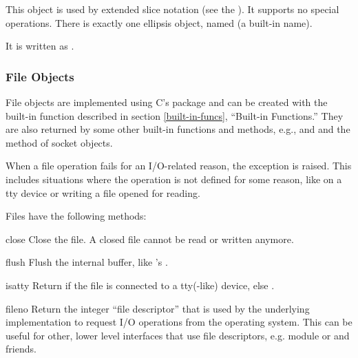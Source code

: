 This object is used by extended slice notation (see the
).  It supports no
special operations.  There is exactly one ellipsis object, named
 (a built-in name).

It is written as .

\subsubsection{File Objects
               \label{bltin-file-objects}}

File objects are implemented using C's  package and can be
created with the built-in function
 described in section 
\ref{built-in-funcs}, ``Built-in Functions.''  They are also returned
by some other built-in functions and methods, e.g.,
 and  and the
 method of socket objects.

When a file operation fails for an I/O-related reason, the exception
 is raised.  This includes situations where the
operation is not defined for some reason, like  on a tty
device or writing a file opened for reading.

Files have the following methods:


\begin{methoddesc}[file]{close}{}
  Close the file.  A closed file cannot be read or written anymore.
\end{methoddesc}

\begin{methoddesc}[file]{flush}{}
  Flush the internal buffer, like 's .
\end{methoddesc}

\begin{methoddesc}[file]{isatty}{}
  Return  if the file is connected to a tty(-like) device, else
  .
\end{methoddesc}

\begin{methoddesc}[file]{fileno}{}
Return the integer ``file descriptor'' that is used by the underlying
implementation to request I/O operations from the operating system.
This can be useful for other, lower level interfaces that use file
descriptors, e.g. module  or  and friends.
\end{methoddesc}

